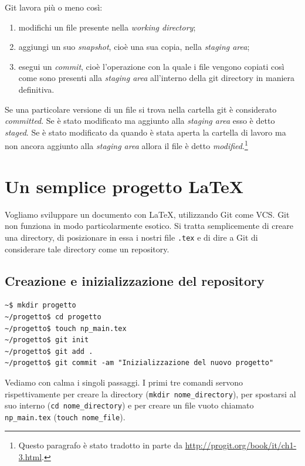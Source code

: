 \documentclass[a4paper,12pt,oneside]{article}
\begin{document}
Git lavora più o meno così:
\begin{enumerate}
\item modifichi un file presente nella \emph{working directory};
\item aggiungi un suo \emph{snapshot}, cioè una sua copia, nella \emph{staging
    area};
\item esegui un \emph{commit}, cioè l'operazione con la quale i file vengono
  copiati così come sono presenti alla \emph{staging area} all'interno della
  git directory in maniera definitiva.
\end{enumerate}
Se una particolare versione di un file si trova nella cartella git è considerato
\emph{committed}. Se è stato modificato ma aggiunto alla \emph{staging area} esso
è detto \emph{staged}. Se è stato modificato da quando è stata aperta la cartella
di lavoro ma non ancora aggiunto alla \emph{staging area} allora il file è detto
\emph{modified}.\footnote{Questo paragrafo è stato tradotto in parte da
  \url{http://progit.org/book/it/ch1-3.html}.}

\section{Un semplice progetto \LaTeX}
Vogliamo sviluppare un documento con \LaTeX, utilizzando Git come VCS.
Git non funziona in modo particolarmente esotico. Si tratta semplicemente di
creare una directory, di posizionare in essa i nostri file \lstinline|.tex| e di
dire a Git di considerare tale directory come un repository.
\subsection{Creazione e inizializzazione del repository}
\begin{lstlisting}
~$ mkdir progetto
~/progetto$ cd progetto
~/progetto$ touch np_main.tex
~/progetto$ git init
~/progetto$ git add .
~/progetto$ git commit -am "Inizializzazione del nuovo progetto"
\end{lstlisting}
Vediamo con calma i singoli passaggi. I primi tre comandi servono
rispettivamente per creare la directory (\lstinline|mkdir nome_directory|),
per spostarsi al suo interno (\lstinline|cd nome_directory|) e per creare
un file vuoto chiamato \lstinline|np_main.tex| (\lstinline|touch nome_file|).
\end{document}
